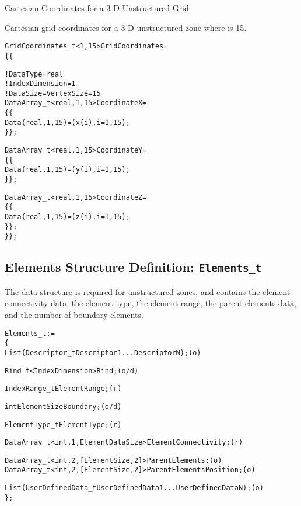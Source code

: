 \begin{example}{Cartesian Coordinates for a 3-D Unstructured Grid}
\label{ex:grid3}

Cartesian grid coordinates for a 3-D unstructured zone where
 is 15.
\begin{alltt}
  GridCoordinates\_t<1, 15> GridCoordinates =
    \{\{

    ! DataType = real
    ! IndexDimension = 1
    ! DataSize = VertexSize = 15
    DataArray\_t<real, 1, 15> CoordinateX =
      \{\{
      Data(real, 1, 15) = (x(i), i=1,15) ;
      \}\} ;

    DataArray\_t<real, 1, 15> CoordinateY =
      \{\{
      Data(real, 1, 15) = (y(i), i=1,15) ;
      \}\} ;

    DataArray\_t<real, 1, 15> CoordinateZ =
      \{\{
      Data(real, 1, 15) = (z(i), i=1,15) ;
      \}\} ;
    \}\} ;
\end{alltt}
\end{example}

\subsection{Elements Structure Definition: \texttt{Elements\_t}}
\label{s:Elements}

The  data structure is required for unstructured
zones, and contains the element connectivity data, the element type,
the element range, the parent elements data, and the number of boundary
elements.

\begin{alltt}
  Elements\_t :=
    \{
    List( Descriptor\_t Descriptor1 ... DescriptorN ) ;                      (o)
 
    Rind\_t<IndexDimension> Rind ;                                           (o/d)

    IndexRange\_t ElementRange ;                                             (r)

    int ElementSizeBoundary ;                                               (o/d)

    ElementType\_t ElementType ;                                             (r)

    DataArray\_t<int, 1, ElementDataSize> ElementConnectivity ;              (r)

    DataArray\_t<int, 2, [ElementSize, 2]> ParentElements ;                  (o)
    DataArray\_t<int, 2, [ElementSize, 2]> ParentElementsPosition ;          (o)

    List( UserDefinedData\_t UserDefinedData1 ... UserDefinedDataN ) ;       (o)
    \} ;
\end{alltt}

